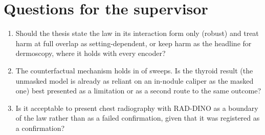 \section{Questions for the supervisor}
\begin{enumerate}\itemsep1pt
\item Should the thesis state the law in its interaction form only (robust) and treat harm at full overlap as
setting-dependent, or keep harm as the headline for dermoscopy, where it holds with every encoder?
\item The counterfactual mechanism holds in \sTwoCfNPos{} of \sTwoCfN{} sweeps. Is the thyroid result (the unmasked model
is already as reliant on an in-nodule caliper as the masked one) best presented as a limitation or as a second route to
the same outcome?
\item Is it acceptable to present chest radiography with RAD-DINO as a boundary of the law rather than as a failed
confirmation, given that it was registered as a confirmation?
\end{enumerate}




